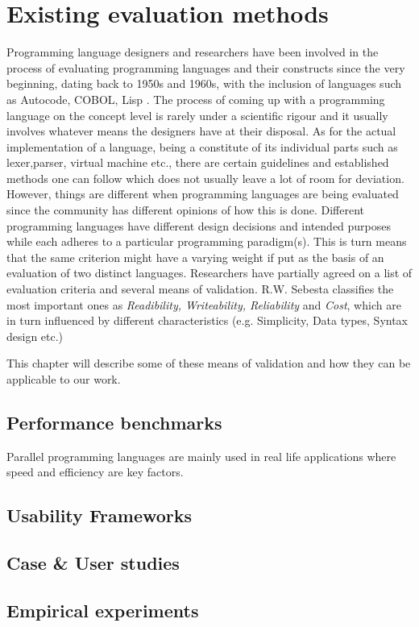\chapter{Existing evaluation methods}
\label{chap:eval_methods}

Programming language designers and researchers have been involved in the process of evaluating programming languages and their constructs since the very beginning, dating back to 1950s and 1960s, with the inclusion of languages such as Autocode, COBOL, Lisp \cite{PLHistory}. The process of coming up with a programming language on the concept level is rarely under a scientific rigour and it usually involves whatever means the designers have at their disposal. As for the actual implementation of a language, being a constitute of its individual parts such as lexer,parser, virtual machine etc., there are certain guidelines and established methods one can follow which does not usually leave a lot of room for deviation. However, things are different when programming languages are being evaluated since the community has different opinions of how this is done. Different programming languages have different design decisions and intended purposes while each adheres to a particular programming paradigm(s). This is turn means that the same criterion might have a varying weight if put as the basis of an evaluation of two distinct languages. Researchers have partially agreed on a list of evaluation criteria and several means of validation. R.W. Sebesta \cite{Sebesta} classifies the most important ones as \textit{Readibility, Writeability, Reliability} and \textit{Cost}, which are in turn influenced by different characteristics (e.g. Simplicity, Data types, Syntax design etc.)

This chapter will describe some of these means of validation and how they can be applicable to our work.

\section{Performance benchmarks}

Parallel programming languages are mainly used in real life applications where speed and efficiency are key factors.


\section{Usability Frameworks}

\section{Case \& User studies}

\section{Empirical experiments}